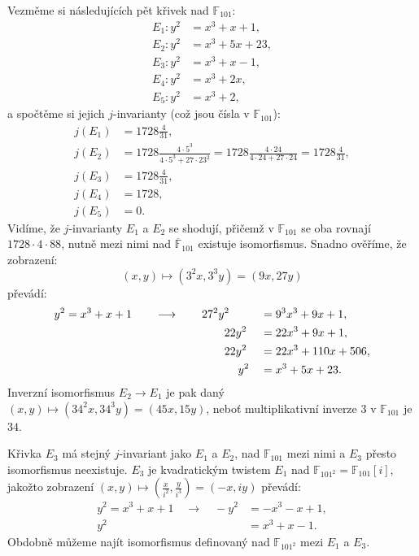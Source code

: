 \documentclass[12pt]{report}
\begin{document}
\begin{priklad}
Vezměme si následujících pět křivek nad $\mathbb{F}_{101}$:
\begin{align*}
E_1 : y^2 &= x^3+x+1,\\
E_2 : y^2 &= x^3+5x+23,\\
E_3 : y^2 &= x^3+x-1,\\
E_4 : y^2 &= x^3+2x,\\
E_5 : y^2 &= x^3+2,
\end{align*}
a spočtěme si jejich $j$-invarianty (což jsou čísla v $\mathbb{F}_{101}$):
\begin{align*}
j(E_1) &= 1728 \frac{4}{31},\\
j(E_2) &= 1728 \frac{4 \cdot 5^3}{4 \cdot 5^3+27 \cdot 23^2} = 1728 \frac{4 \cdot 24}{4 \cdot 24 + 27 \cdot 24} = 1728 \frac{4}{31},\\
j(E_3) &= 1728 \frac{4}{31},\\
j(E_4) &= 1728,\\
j(E_5) &= 0.
\end{align*}
Vidíme, že $j$-invarianty $E_1$ a $E_2$ se shodují, přičemž v $\mathbb{F}_{101}$ se oba rovnají $1728 \cdot 4 \cdot 88$, nutně mezi nimi nad $\overline{\mathbb{F}}_{101}$ existuje isomorfismus. Snadno ověříme, že zobrazení:
\begin{equation*}
(x,y) \longmapsto (3^2 x, 3^3 y) = (9x,27y) 
\end{equation*}
převádí:
\begin{alignat*}{3}
y^2 &= x^3+x+1 \qquad \longrightarrow \qquad 27^2 y^2&&= 9^3 x^3 + 9x + 1,\\
&\qquad \hspace*{4.225cm}  22y^2&&= 22 x^3 + 9x + 1,\\
&\qquad \hspace*{4.225cm} 22y^2&&= 22 x^3 + 110x + 506,\\
&\qquad \hspace*{4.65cm} y^2&&= x^3 + 5x + 23.
\end{alignat*}
Inverzní isomorfismus $E_2 \longrightarrow E_1$ je pak daný $(x,y) \mapsto (34^2 x, 34^3 y) = (45x,15y)$, neboť multiplikativní inverze $3$ v $\mathbb{F}_{101}$ je $34$.

Křivka $E_3$ má stejný $j$-invariant jako $E_1$ a $E_2$, nad $\mathbb{F}_{101}$ mezi nimi a $E_3$ přesto isomorfismus neexistuje. $E_3$ je kvadratickým twistem $E_1$ nad $\mathbb{F}_{101^2} = \mathbb{F}_{101}[i]$, jakožto zobrazení $(x,y) \mapsto \left(\frac{x}{i^2}, \frac{y}{i^3}\right) = (-x,iy)$ převádí:
\begin{align*}
y^2 = x^3+x+1 \quad \longrightarrow \quad -y^2 &= -x^3-x+1,\\
 y^2 &=  x^3 + x - 1.
\end{align*}
Obdobně můžeme najít isomorfismus definovaný nad $\mathbb{F}_{101^2}$ mezi $E_1$ a $E_3$.\end{priklad}
\end{document}
